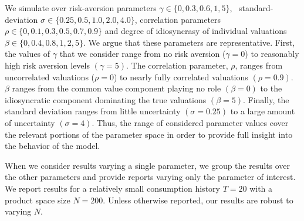 \documentclass[format=acmsmall, review=false]{acmart}
\begin{document}
We simulate over risk-aversion parameters $\gamma \in \{ 0, 0.3, 0.6, 1, 5 \}$, \ standard-deviation $\sigma \in \{ 0.25, 0.5, 1.0, 2.0, 4.0 \}$, correlation parameters $\rho\in \{ 0, 0.1, 0.3, 0.5, 0.7, 0.9 \} $ and degree of idiosyncrasy of individual valuations $\beta \in \{ 0, 0.4, 0.8, 1, 2, 5\}$. We argue that these parameters are representative. First, the values of $\gamma$ that we consider range from no risk aversion ($\gamma = 0$) to reasonably high risk aversion levels $(\gamma = 5)$. The correlation parameter, $\rho$, ranges from uncorrelated valuations ($\rho = 0$) to nearly fully correlated valuations $(\rho = 0.9)$. $\beta$ ranges from the common value component playing no role $(\beta = 0)$ to the idiosyncratic component dominating the true valuations $(\beta = 5)$. Finally, the standard deviation ranges from little uncertainty $(\sigma = 0.25)$ to a large amount of uncertainty $(\sigma = 4)$. Thus, the range of considered parameter values cover the relevant portions of the parameter space in order to provide full insight into the behavior of the model. 
\par
When we consider results varying a single parameter, we group the results over the other parameters and provide reports varying only the parameter of interest. We report results for a relatively small consumption history $T=20$ with a product space size $N=200$. Unless otherwise reported, our results are robust to varying $N$.
\par
\end{document}
